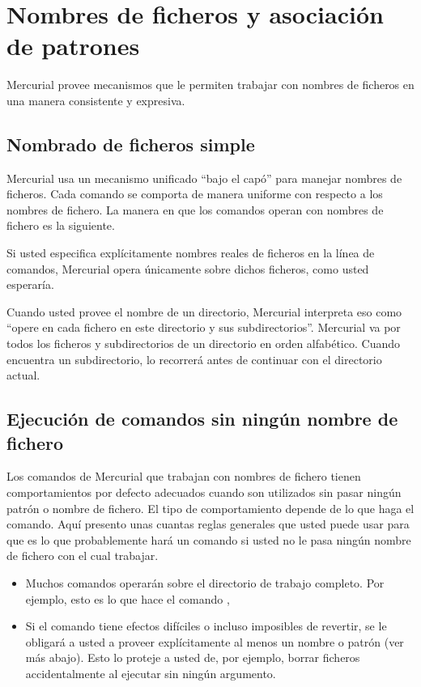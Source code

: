 \chapter{Nombres de ficheros y asociación de patrones}
\label{chap:names}

Mercurial provee mecanismos que le permiten trabajar con nombres de
ficheros en una manera consistente y expresiva.

\section{Nombrado de ficheros simple}

Mercurial usa un mecanismo unificado ``bajo el capó'' para manejar
nombres de ficheros. Cada comando se comporta de manera uniforme con
respecto a los nombres de fichero. La manera en que los comandos
operan con nombres de fichero es la siguiente.

Si usted especifica explícitamente nombres reales de ficheros en la
línea de comandos, Mercurial opera únicamente sobre dichos ficheros,
como usted esperaría.

Cuando usted provee el nombre de un directorio, Mercurial interpreta
eso como ``opere en cada fichero en este directorio y sus
subdirectorios''. Mercurial va por todos los ficheros y subdirectorios
de un directorio en orden alfabético. Cuando encuentra un
subdirectorio, lo recorrerá antes de continuar con el directorio
actual.

\section{Ejecución de comandos sin ningún nombre de fichero}

Los comandos de Mercurial que trabajan con nombres de fichero tienen
comportamientos por defecto adecuados cuando son utilizados sin pasar
ningún patrón o nombre de fichero. El tipo de comportamiento depende
de lo que haga el comando. Aquí presento unas cuantas reglas generales
que usted puede usar para que es lo que probablemente hará un comando
si usted no le pasa ningún nombre de fichero con el cual trabajar.
\begin{itemize}
\item Muchos comandos operarán sobre el directorio de trabajo
    completo. Por ejemplo, esto es lo que hace el comando
    ,
\item Si el comando tiene efectos difíciles o incluso imposibles de
    revertir, se le obligará a usted a proveer explícitamente al menos
    un nombre o patrón (ver más abajo). Esto lo proteje a usted de,
    por ejemplo, borrar ficheros accidentalmente al ejecutar
     sin ningún argumento.
\end{itemize}


